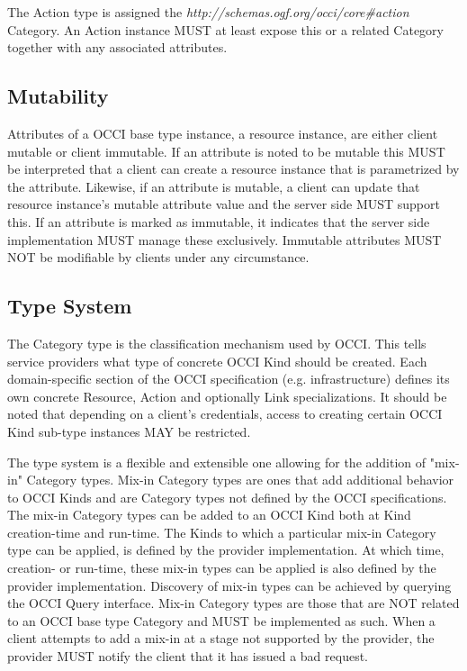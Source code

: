 \documentclass[10pt,a4paper,british]{article}
\begin{document}
The Action type is assigned the
\textit{http://schemas.ogf.org/occi/core\#action} Category. An Action
instance MUST at least expose this or a related Category together with
any associated attributes.

\subsection{Mutability}
Attributes of a OCCI base type instance, a resource instance, are
either client mutable or client immutable. If an attribute is noted to
be mutable this MUST be interpreted that a client can create a
resource instance that is parametrized by the attribute. Likewise, if
an attribute is mutable, a client can update that resource instance's
mutable attribute value and the server side MUST support this. If an
attribute is marked as immutable, it indicates that the server side
implementation MUST manage these exclusively. Immutable attributes
MUST NOT be modifiable by clients under any circumstance.

\subsection{Type System}
\label{sec:type_system}
The Category type is the classification mechanism used by OCCI. This
tells service providers what type of concrete OCCI Kind should be
created. Each domain-specific section of the OCCI specification
(e.g. infrastructure) defines its own concrete Resource, Action and
optionally Link specializations. It should be noted that depending on
a client's credentials, access to creating certain OCCI Kind sub-type instances
MAY be restricted.

The type system is a flexible and extensible one allowing for the
addition of "mix-in" Category types. Mix-in Category types are ones
that add additional behavior to OCCI Kinds and are Category types not
defined by the OCCI specifications. The mix-in Category types can be
added to an OCCI Kind both at Kind creation-time and run-time. The
Kinds to which a particular mix-in Category type can be applied, is
defined by the provider implementation. At which time, creation- or
run-time, these mix-in types can be applied is also defined by the
provider implementation. Discovery of mix-in types can be achieved by
querying the OCCI Query interface. Mix-in Category types are those
that are NOT related to an OCCI base type Category and MUST be
implemented as such. When a client attempts to add a mix-in at a stage
not supported by the provider, the provider MUST notify the client
that it has issued a bad request.
\end{document}
